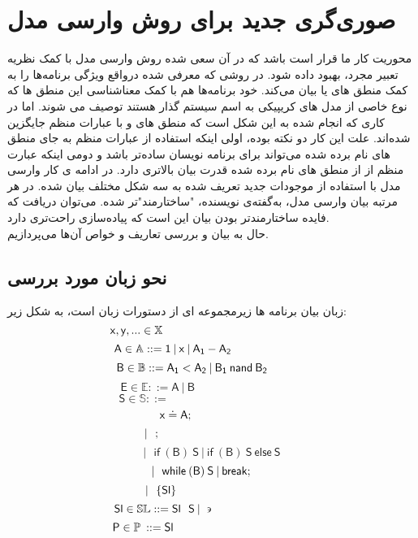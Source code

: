 
\chapter{صوری‌گری جدید برای روش وارسی مدل}

محوریت کار ما قرار است\cite{calcul} باشد که در آن سعی شده روش وارسی مدل با کمک نظریه تعبیر مجرد، بهبود داده شود. در\cite{clarke} روشی که معرفی شده در‌واقع ویژگی برنامه‌ها را به کمک منطق های  یا  بیان می‌کند. خود برنامه‌ها هم با کمک معناشناسی این منطق ها که نوع خاصی از مدل های کریپیکی به اسم سیستم گذار هستند توصیف می شوند. اما در\cite{calcul} کاری که انجام شده به این شکل است که منطق های  و  با عبارات منظم\cite{kleene56} جایگزین شده‌اند. علت این کار دو نکته بوده، اولی اینکه استفاده از عبارات منظم به جای منطق های نام برده شده می‌تواند برای برنامه نویسان ساده‌تر باشد و دومی اینکه عبارت منظم از از منطق های نام برده شده قدرت بیان بالاتری دارد.\cite{regisbetter} در ادامه ی کار وارسی مدل با استفاده از موجودات جدید تعریف شده به سه شکل مختلف بیان شده. در هر مرتبه بیان وارسی مدل، به‌گفته‌ی نویسنده، "ساختارمند"تر شده. می‌توان دریافت که فایده ساختارمندتر بودن بیان این است که پیاده‌سازی راحت‌تری دارد.\\
حال به بیان و بررسی تعاریف و خواص آن‌ها می‌پردازیم.

\section{نحو زبان مورد بررسی‬}

زبان بیان برنامه ها زیرمجموعه ای از دستورات زبان  است، به شکل زیر:
$$\mathsf{x,y},... \in \mathbb{X}\hspace{4.65cm}$$
$$\mathsf{A} \in \mathbb{A} ::=\mathsf{1\:|\:x\:|\:A_1 - A_2\hspace{2.4cm}}$$  
$$\mathsf{B \in \mathbb{B} ::=A_1<A_2 \:|\: B_1 \: nand\: B_2\hspace{1.2cm}}$$
$$\mathsf{E \in \mathbb{E}::= A \: | \: B\hspace{4cm}}$$
$$\mathsf{S\in \mathbb{S} ::=\hspace{5cm}  }$$
$$\mathsf{x\doteq A; \hspace{2.25cm}}$$
$$\mathsf{|\:\:\:;\hspace{3.75cm}}$$
$$\mathsf{|\:\:\:if\:(B)\:S\:|\:if\:(B)\:S\:else\:S}$$
$$\mathsf{|\:\:\:while\:(B)\:S\: | \: break;\hspace{0.65cm}}$$
$$\mathsf{|\:\:\:\{Sl\}\hspace{3.15cm}}$$
$$\mathsf{Sl \in \mathbb{SL}::=Sl\:\:\:S\:|\:\backepsilon}\hspace{3.05cm}$$
$$\mathsf{P\in \mathbb{P}\:::=Sl}\hspace{4.25cm}$$


